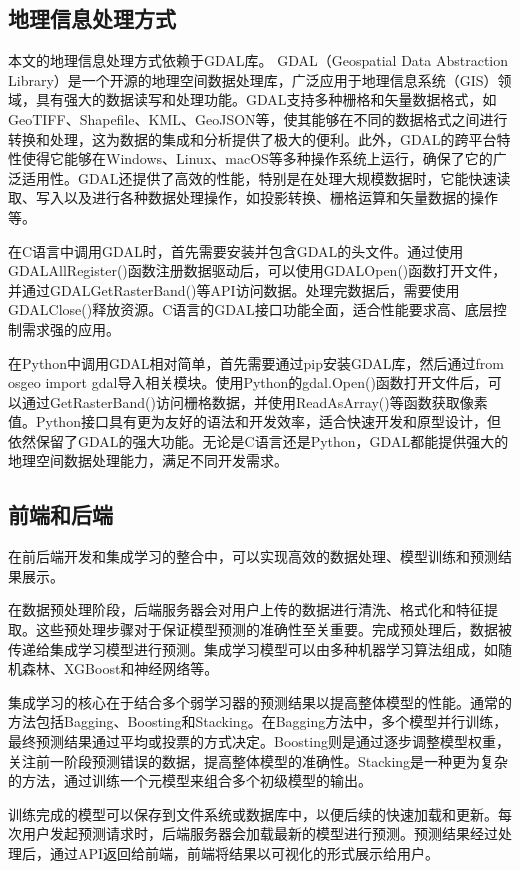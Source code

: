 \documentclass{article}
\begin{document}
	
	\subsection{地理信息处理方式}

	本文的地理信息处理方式依赖于GDAL库。
	GDAL（Geospatial Data Abstraction Library）是一个开源的地理空间数据处理库，广泛应用于地理信息系统（GIS）领域，具有强大的数据读写和处理功能。GDAL支持多种栅格和矢量数据格式，如GeoTIFF、Shapefile、KML、GeoJSON等，使其能够在不同的数据格式之间进行转换和处理，这为数据的集成和分析提供了极大的便利。此外，GDAL的跨平台特性使得它能够在Windows、Linux、macOS等多种操作系统上运行，确保了它的广泛适用性。GDAL还提供了高效的性能，特别是在处理大规模数据时，它能快速读取、写入以及进行各种数据处理操作，如投影转换、栅格运算和矢量数据的操作等。
	
	在C语言中调用GDAL时，首先需要安装并包含GDAL的头文件。通过使用GDALAllRegister()函数注册数据驱动后，可以使用GDALOpen()函数打开文件，并通过GDALGetRasterBand()等API访问数据。处理完数据后，需要使用GDALClose()释放资源。C语言的GDAL接口功能全面，适合性能要求高、底层控制需求强的应用。
	
	在Python中调用GDAL相对简单，首先需要通过pip安装GDAL库，然后通过from osgeo import gdal导入相关模块。使用Python的gdal.Open()函数打开文件后，可以通过GetRasterBand()访问栅格数据，并使用ReadAsArray()等函数获取像素值。Python接口具有更为友好的语法和开发效率，适合快速开发和原型设计，但依然保留了GDAL的强大功能。无论是C语言还是Python，GDAL都能提供强大的地理空间数据处理能力，满足不同开发需求。


	\subsection{前端和后端}
	在前后端开发和集成学习的整合中，可以实现高效的数据处理、模型训练和预测结果展示。
	
	在数据预处理阶段，后端服务器会对用户上传的数据进行清洗、格式化和特征提取。这些预处理步骤对于保证模型预测的准确性至关重要。完成预处理后，数据被传递给集成学习模型进行预测。集成学习模型可以由多种机器学习算法组成，如随机森林、XGBoost和神经网络等。
	
	集成学习的核心在于结合多个弱学习器的预测结果以提高整体模型的性能。通常的方法包括Bagging、Boosting和Stacking。在Bagging方法中，多个模型并行训练，最终预测结果通过平均或投票的方式决定。Boosting则是通过逐步调整模型权重，关注前一阶段预测错误的数据，提高整体模型的准确性。Stacking是一种更为复杂的方法，通过训练一个元模型来组合多个初级模型的输出。
	
	训练完成的模型可以保存到文件系统或数据库中，以便后续的快速加载和更新。每次用户发起预测请求时，后端服务器会加载最新的模型进行预测。预测结果经过处理后，通过API返回给前端，前端将结果以可视化的形式展示给用户。
	
\end{document}
